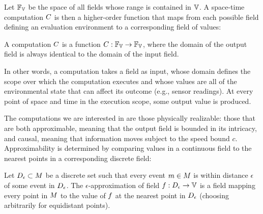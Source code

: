 \documentclass[12pt,a4paper,twoside,openright]{book}
\begin{document}
Let $\fieldsof{\spaceof{\datavalue}}$ be the space of all fields whose range is contained in ${\spaceof{\datavalue}}$.
%
A space-time computation $C$ is then a higher-order function that maps from each possible field defining an evaluation environment to a corresponding field of values:
\begin{thrdefn}
  A computation $C$ is a function $\computation: \fieldsof{\spaceof{\datavalue}} \rightarrow \fieldsof{\spaceof{\datavalue}}$, where the domain of the output field is always identical to the domain of the input field.
\end{thrdefn}
\noindent
In other words, a computation takes a field as input, whose domain defines the scope over which the computation executes and whose values are all of the environmental state that can affect its outcome (e.g., sensor readings).  At every point of space and time in the execution scope, some output value is produced.

The computations we are interested in are those physically realizable: those that are both approximable, meaning that the output field is bounded in its intricacy, and causal, meaning that information moves subject to the speed bound $c$.
%
Approximability is determined by comparing values in a continuous field to the nearest points in a corresponding discrete field:

\begin{thrdefn}\label{def:eapprox}
  Let $D_{\epsilon} \subset M$ be a discrete set such that every event $m \in M$ is within distance $\epsilon$ of some event in $D_{\epsilon}$.
  The $\epsilon$-approximation of field $\field: \discreteset_{\epsilon} \rightarrow \spaceof{\datavalue}$ is a field mapping every point in $M$ to the value of $f$ at the nearest point in $D_{\epsilon}$ (choosing arbitrarily for equidistant points).
\end{thrdefn}
\end{document}

